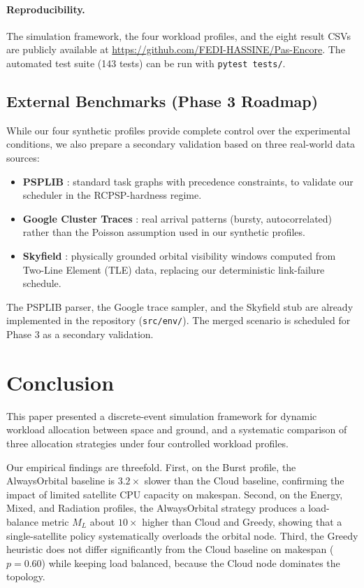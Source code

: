 \documentclass[conference]{IEEEtran}
\begin{document}
\paragraph{Reproducibility.}
The simulation framework, the four workload profiles, and the eight result CSVs are publicly available at \url{https://github.com/FEDI-HASSINE/Pas-Encore}. The automated test suite (143 tests) can be run with \texttt{pytest tests/}.

\subsection{External Benchmarks (Phase 3 Roadmap)}
\label{sec:external-benchmarks}

While our four synthetic profiles provide complete control over the experimental conditions, we also prepare a secondary validation based on three real-world data sources:
\begin{itemize}
    \item \textbf{PSPLIB} \cite{psplib}: standard task graphs with precedence constraints, to validate our scheduler in the RCPSP-hardness regime.
    \item \textbf{Google Cluster Traces} \cite{google-traces}: real arrival patterns (bursty, autocorrelated) rather than the Poisson assumption used in our synthetic profiles.
    \item \textbf{Skyfield} \cite{skyfield}: physically grounded orbital visibility windows computed from Two-Line Element (TLE) data, replacing our deterministic link-failure schedule.
\end{itemize}
The PSPLIB parser, the Google trace sampler, and the Skyfield stub are already implemented in the repository (\texttt{src/env/}). The merged scenario is scheduled for Phase 3 as a secondary validation.

\section{Conclusion}
\label{sec:conclusion}

This paper presented a discrete-event simulation framework for dynamic workload allocation between space and ground, and a systematic comparison of three allocation strategies under four controlled workload profiles.

Our empirical findings are threefold. First, on the Burst profile, the AlwaysOrbital baseline is $3.2\times$ slower than the Cloud baseline, confirming the impact of limited satellite CPU capacity on makespan. Second, on the Energy, Mixed, and Radiation profiles, the AlwaysOrbital strategy produces a load-balance metric $M_L$ about $10\times$ higher than Cloud and Greedy, showing that a single-satellite policy systematically overloads the orbital node. Third, the Greedy heuristic does not differ significantly from the Cloud baseline on makespan ($p=0.60$) while keeping load balanced, because the Cloud node dominates the topology.
\end{document}
